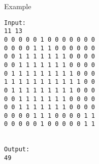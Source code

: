 Example
\begin{verbatim}
Input:
11 13
0 0 0 0 0 1 0 0 0 0 0 0 0
0 0 0 0 1 1 1 0 0 0 0 0 0
0 0 1 1 1 1 1 1 1 0 0 0 0
0 0 1 1 1 1 1 1 1 0 0 0 0
0 1 1 1 1 1 1 1 1 1 0 0 0
1 1 1 1 1 1 1 1 1 1 1 0 0
0 1 1 1 1 1 1 1 1 1 0 0 0
0 0 1 1 1 1 1 1 1 0 0 0 0
0 0 1 1 1 1 1 1 1 0 0 0 0
0 0 0 0 1 1 1 0 0 0 0 1 1
0 0 0 0 0 1 0 0 0 0 0 1 1


Output:
49
\end{verbatim}